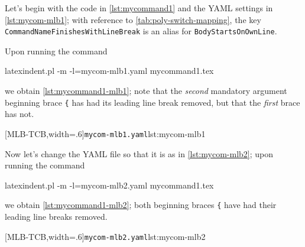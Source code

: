  \begin{example}
 Let's begin with the code in \cref{lst:mycommand1} and the YAML settings in
 \cref{lst:mycom-mlb1}; with reference to \vref{tab:poly-switch-mapping}, the key
 \texttt{CommandNameFinishesWithLineBreak} is an alias for \texttt{BodyStartsOnOwnLine}.


 Upon running the command  

 \begin{commandshell}
latexindent.pl -m -l=mycom-mlb1.yaml mycommand1.tex
\end{commandshell}

 we obtain \cref{lst:mycommand1-mlb1}; note that the \emph{second} mandatory argument
 beginning brace \lstinline!{! has had its leading line break removed, but that the
 \emph{first} brace has not.

 \begin{cmhtcbraster}[
   raster force size=false,
   raster column 1/.style={add to width=-1cm},
  ]
  [MLB-TCB,width=.6\textwidth]{\texttt{mycom-mlb1.yaml}}{lst:mycom-mlb1}
 \end{cmhtcbraster}
 \end{example}

 \begin{example}
 Now let's change the YAML file so that it is as in \cref{lst:mycom-mlb2}; upon running
 the command

 \begin{commandshell}
latexindent.pl -m -l=mycom-mlb2.yaml mycommand1.tex
\end{commandshell}

 we obtain \cref{lst:mycommand1-mlb2}; both beginning braces \lstinline!{! have had their
 leading line breaks removed.

 \begin{cmhtcbraster}[
   raster force size=false,
   raster column 1/.style={add to width=-1cm},
  ]
  [MLB-TCB,width=.6\textwidth]{\texttt{mycom-mlb2.yaml}}{lst:mycom-mlb2}
 \end{cmhtcbraster}
 \end{example}

